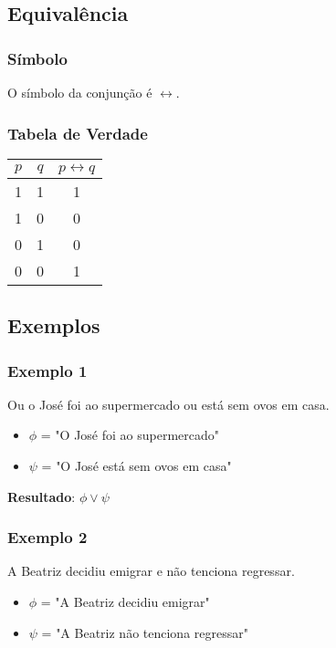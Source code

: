 \subsection{Equivalência}

\subsubsection{Símbolo}
O símbolo da conjunção é $\leftrightarrow$.

\subsubsection{Tabela de Verdade}
\begin{table}[H]
    \begin{tabular}{|c|c|c|}
        \hline
        $p$ & $q$ & $p \leftrightarrow q$ \\
        \hline
        1 & 1 & 1 \\
        1 & 0 & 0 \\
        0 & 1 & 0 \\
        0 & 0 & 1 \\
        \hline
    \end{tabular}
\end{table}

\subsection{Exemplos}

\subsubsection{Exemplo 1}
Ou o José foi ao supermercado ou está sem ovos em casa.

\begin{itemize}
    \item $\phi$ = "O José foi ao supermercado"
    \item $\psi$ = "O José está sem ovos em casa"
\end{itemize}

\textbf{Resultado}: $\phi \lor \psi$

\subsubsection{Exemplo 2}
A Beatriz decidiu emigrar e não tenciona regressar.

\begin{itemize}
    \item $\phi$ = "A Beatriz decidiu emigrar"
    \item $\psi$ = "A Beatriz não tenciona regressar"
\end{itemize}

